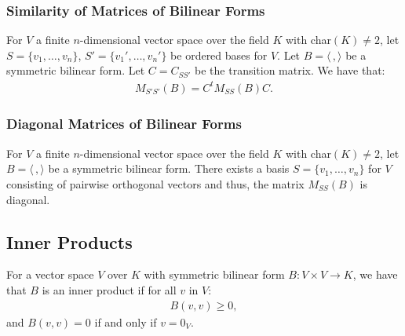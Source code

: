 \subsubsection{Similarity of Matrices of Bilinear Forms}

For $V$ a finite $n$-dimensional vector space over the field $K$ with char$(K) \neq 2$, 
let $S = \{v_1, \ldots, v_n\}$, $S' = \{v_1', \ldots, v_n'\}$ be
ordered bases for $V$. Let $B = \langle \, , \rangle$ be a symmetric bilinear form.
Let $C = C_{SS'}$ be the transition matrix. We have that: \begin{gather*}
  M_{S'S'}(B) = C^tM_{SS}(B)C.
\end{gather*}

\subsubsection{Diagonal Matrices of Bilinear Forms}

For $V$ a finite $n$-dimensional vector space over the field $K$ with char$(K) \neq 2$, 
let $B = \langle \, , \rangle$ be a symmetric bilinear form.
There exists a basis $S = \{v_1, \ldots, v_n\}$ for $V$ consisting of pairwise orthogonal
vectors and thus, the matrix $M_{SS}(B)$ is diagonal.

\subsection{Inner Products}

For a vector space $V$ over $K$ with symmetric bilinear form $B : V \times V \to K$, we
have that $B$ is an inner product if for all $v$ in $V$: \begin{gather*}
  B(v, v) \geq 0,
\end{gather*} and $B(v, v) = 0$ if and only if $v = 0_V$.